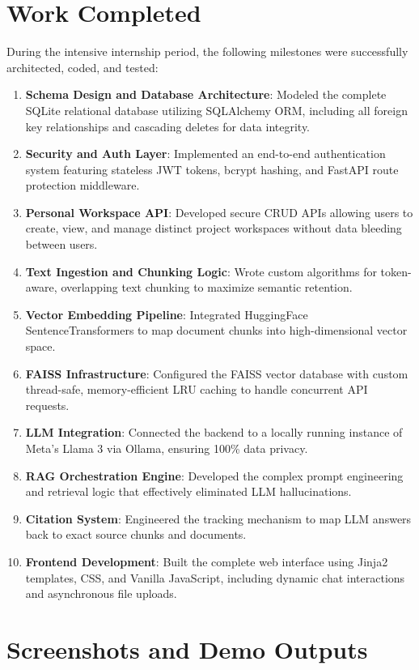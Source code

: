 \documentclass[12pt, a4paper]{report}
\begin{document}
\chapter{Work Completed}

During the intensive internship period, the following milestones were successfully architected, coded, and tested:
\begin{enumerate}
    \item \textbf{Schema Design and Database Architecture}: Modeled the complete SQLite relational database utilizing SQLAlchemy ORM, including all foreign key relationships and cascading deletes for data integrity.
    \item \textbf{Security and Auth Layer}: Implemented an end-to-end authentication system featuring stateless JWT tokens, bcrypt hashing, and FastAPI route protection middleware.
    \item \textbf{Personal Workspace API}: Developed secure CRUD APIs allowing users to create, view, and manage distinct project workspaces without data bleeding between users.
    \item \textbf{Text Ingestion and Chunking Logic}: Wrote custom algorithms for token-aware, overlapping text chunking to maximize semantic retention.
    \item \textbf{Vector Embedding Pipeline}: Integrated HuggingFace SentenceTransformers to map document chunks into high-dimensional vector space.
    \item \textbf{FAISS Infrastructure}: Configured the FAISS vector database with custom thread-safe, memory-efficient LRU caching to handle concurrent API requests.
    \item \textbf{LLM Integration}: Connected the backend to a locally running instance of Meta's Llama 3 via Ollama, ensuring 100\% data privacy.
    \item \textbf{RAG Orchestration Engine}: Developed the complex prompt engineering and retrieval logic that effectively eliminated LLM hallucinations.
    \item \textbf{Citation System}: Engineered the tracking mechanism to map LLM answers back to exact source chunks and documents.
    \item \textbf{Frontend Development}: Built the complete web interface using Jinja2 templates, CSS, and Vanilla JavaScript, including dynamic chat interactions and asynchronous file uploads.
\end{enumerate}

\chapter{Screenshots and Demo Outputs}
\end{document}

